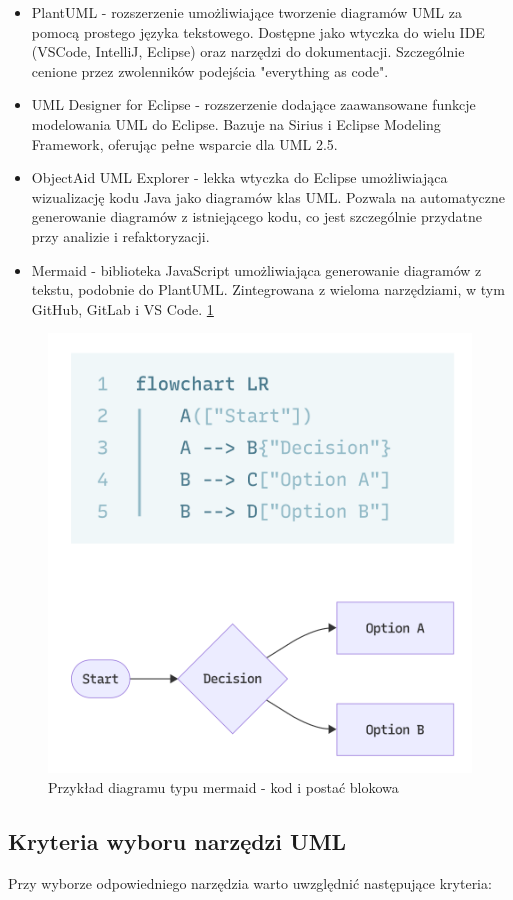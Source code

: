 \documentclass[12pt,a4paper]{article}
\begin{document}
\begin{itemize}
    \item PlantUML - rozszerzenie umożliwiające tworzenie diagramów UML za pomocą prostego języka tekstowego. Dostępne jako wtyczka do wielu IDE (VSCode, IntelliJ, Eclipse) oraz narzędzi do dokumentacji. Szczególnie cenione przez zwolenników podejścia "everything as code".
    
    \item UML Designer for Eclipse - rozszerzenie dodające zaawansowane funkcje modelowania UML do Eclipse. Bazuje na Sirius i Eclipse Modeling Framework, oferując pełne wsparcie dla UML 2.5.
    
    \item ObjectAid UML Explorer - lekka wtyczka do Eclipse umożliwiająca wizualizację kodu Java jako diagramów klas UML. Pozwala na automatyczne generowanie diagramów z istniejącego kodu, co jest szczególnie przydatne przy analizie i refaktoryzacji.
    
    \item Mermaid - biblioteka JavaScript umożliwiająca generowanie diagramów z tekstu, podobnie do PlantUML. Zintegrowana z wieloma narzędziami, w tym GitHub, GitLab i VS Code. \ref{fig:mermaid_diagram_example}
\end{itemize}

\begin{figure}[H]
    \centering
    \includegraphics[width=0.5\linewidth]{mermaid_diagram_example.png}
    \caption{Przykład diagramu typu mermaid - kod i postać blokowa}
    \label{fig:mermaid_diagram_example}
\end{figure}

\subsection{Kryteria wyboru narzędzi UML}
Przy wyborze odpowiedniego narzędzia warto uwzględnić następujące kryteria:
\end{document}
